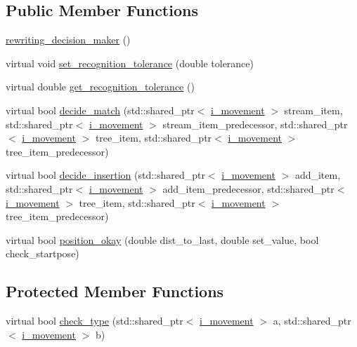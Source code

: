 \subsection*{Public Member Functions}
\begin{DoxyCompactItemize}
\item 
\hyperlink{classmae_1_1fl_1_1laban_1_1rewriting__decision__maker_af1d9dbfca7df3e5219641e3c5ef4c8d1}{rewriting\-\_\-decision\-\_\-maker} ()
\item 
virtual void \hyperlink{classmae_1_1fl_1_1laban_1_1rewriting__decision__maker_a2904cfea7637998087e5e387f077d9e9}{set\-\_\-recognition\-\_\-tolerance} (double tolerance)
\item 
virtual double \hyperlink{classmae_1_1fl_1_1laban_1_1rewriting__decision__maker_aa21cd4d1affba8c2e784565aee732456}{get\-\_\-recognition\-\_\-tolerance} ()
\item 
virtual bool \hyperlink{classmae_1_1fl_1_1laban_1_1rewriting__decision__maker_ae33a9f027e52bab0cc9be93eeb589d64}{decide\-\_\-match} (std\-::shared\-\_\-ptr$<$ \hyperlink{classmae_1_1fl_1_1laban_1_1i__movement}{i\-\_\-movement} $>$ stream\-\_\-item, std\-::shared\-\_\-ptr$<$ \hyperlink{classmae_1_1fl_1_1laban_1_1i__movement}{i\-\_\-movement} $>$ stream\-\_\-item\-\_\-predecessor, std\-::shared\-\_\-ptr$<$ \hyperlink{classmae_1_1fl_1_1laban_1_1i__movement}{i\-\_\-movement} $>$ tree\-\_\-item, std\-::shared\-\_\-ptr$<$ \hyperlink{classmae_1_1fl_1_1laban_1_1i__movement}{i\-\_\-movement} $>$ tree\-\_\-item\-\_\-predecessor)
\item 
virtual bool \hyperlink{classmae_1_1fl_1_1laban_1_1rewriting__decision__maker_a01849dbcdda4878338a3cda18f7040a8}{decide\-\_\-insertion} (std\-::shared\-\_\-ptr$<$ \hyperlink{classmae_1_1fl_1_1laban_1_1i__movement}{i\-\_\-movement} $>$ add\-\_\-item, std\-::shared\-\_\-ptr$<$ \hyperlink{classmae_1_1fl_1_1laban_1_1i__movement}{i\-\_\-movement} $>$ add\-\_\-item\-\_\-predecessor, std\-::shared\-\_\-ptr$<$ \hyperlink{classmae_1_1fl_1_1laban_1_1i__movement}{i\-\_\-movement} $>$ tree\-\_\-item, std\-::shared\-\_\-ptr$<$ \hyperlink{classmae_1_1fl_1_1laban_1_1i__movement}{i\-\_\-movement} $>$ tree\-\_\-item\-\_\-predecessor)
\item 
virtual bool \hyperlink{classmae_1_1fl_1_1laban_1_1rewriting__decision__maker_aee7c8ddde89262cc7a9c26ad041ea344}{position\-\_\-okay} (double dist\-\_\-to\-\_\-last, double set\-\_\-value, bool check\-\_\-startpose)
\end{DoxyCompactItemize}
\subsection*{Protected Member Functions}
\begin{DoxyCompactItemize}
\item 
virtual bool \hyperlink{classmae_1_1fl_1_1laban_1_1rewriting__decision__maker_a9cf4ad043611ae5bb95049e13cc4d184}{check\-\_\-type} (std\-::shared\-\_\-ptr$<$ \hyperlink{classmae_1_1fl_1_1laban_1_1i__movement}{i\-\_\-movement} $>$ a, std\-::shared\-\_\-ptr$<$ \hyperlink{classmae_1_1fl_1_1laban_1_1i__movement}{i\-\_\-movement} $>$ b)
\end{DoxyCompactItemize}


